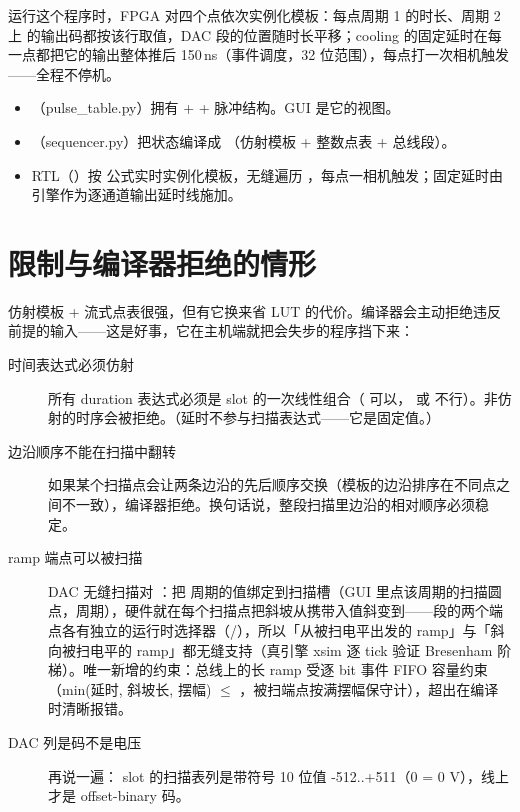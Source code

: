 \documentclass[11pt,oneside,openany]{book}
\begin{document}
运行这个程序时，FPGA 对四个点依次实例化模板：每点周期 1 的时长、周期 2 上  的输出码都按该行取值，DAC 段的位置随时长平移；cooling 的固定延时在每一点都把它的输出整体推后 150\,ns（事件调度，32 位范围），每点打一次相机触发——全程不停机。

\begin{notebox}
\begin{itemize}
\item {}（pulse\_table.py）拥有  +  + 脉冲结构。GUI 是它的视图。
\item {}（sequencer.py）把状态编译成 （仿射模板 + 整数点表 + 总线段）。
\item RTL（）按  公式实时实例化模板，无缝遍历 ，每点一相机触发；固定延时由引擎作为逐通道输出延时线施加。
\end{itemize}
\end{notebox}

\section{限制与编译器拒绝的情形}

仿射模板 + 流式点表很强，但有它换来省 LUT 的代价。编译器会主动拒绝违反前提的输入——这是好事，它在主机端就把会失步的程序挡下来：

\begin{description}
\item[时间表达式必须仿射] 所有 duration 表达式必须是 slot 的一次线性组合（ 可以， 或  不行）。非仿射的时序会被拒绝。（延时不参与扫描表达式——它是固定值。）
\item[边沿顺序不能在扫描中翻转] 如果某个扫描点会让两条边沿的先后顺序交换（模板的边沿排序在不同点之间不一致），编译器拒绝。换句话说，整段扫描里边沿的相对顺序必须稳定。
\item[ramp 端点可以被扫描] DAC 无缝扫描对 ：把  周期的值绑定到扫描槽（GUI 里点该周期的扫描圆点，周期），硬件就在每个扫描点把斜坡从携带入值斜变到——段的两个端点各有独立的运行时选择器（/），所以「从被扫电平出发的 ramp」与「斜向被扫电平的 ramp」都无缝支持（真引擎 xsim  逐 tick 验证 Bresenham 阶梯）。唯一新增的约束：总线上的长 ramp 受逐 bit 事件 FIFO 容量约束（min(延时, 斜坡长, 摆幅) $\le$ ，被扫端点按满摆幅保守计），超出在编译时清晰报错。
\item[DAC 列是码不是电压] 再说一遍： slot 的扫描表列是带符号 10 位值 -512..+511（0 = 0 V），线上才是 offset-binary 码。
\end{description}
\end{document}
